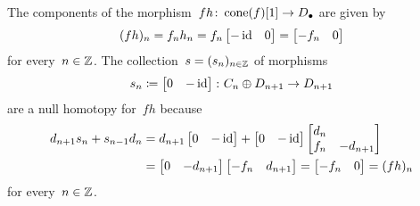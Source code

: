 \section{}





\subsection{}

The components of the morphism~$fh \colon \operatorname{cone}(f)[1] \to D_\bullet$ are given by
\[
    (fh)_n
  = f_n h_n
  = f_n
    \begin{bmatrix}
      -\operatorname{id}  & 0
    \end{bmatrix}
  = \begin{bmatrix}
      -f_n  & 0
    \end{bmatrix}
\]
for every~$n \in \mathbb{Z}$.
The collection~$s = (s_n)_{n \in \mathbb{Z}}$ of morphisms
\[
            s_n
  \coloneqq  \begin{bmatrix}
              0 & -\operatorname{id}
            \end{bmatrix}
  \colon    C_n \oplus D_{n+1}
  \to       D_{n+1}
\]
are a null homotopy for~$fh$ because
\begin{align*}
      d_{n+1} s_n + s_{n-1} d_n
  &=  d_{n+1}
      \begin{bmatrix}
        0 & -\operatorname{id}
      \end{bmatrix}
      +
      \begin{bmatrix}
        0 & -\operatorname{id}
      \end{bmatrix}
      \begin{bmatrix}
        d_n &           \\
        f_n & -d_{n+1}
      \end{bmatrix}
\\
  &=  \begin{bmatrix}
        0 & -d_{n+1}
      \end{bmatrix}
      \begin{bmatrix}
        -f_n  & d_{n+1}
      \end{bmatrix}
   =  \begin{bmatrix}
        -f_n  & 0
      \end{bmatrix}
   =  (fh)_n
\end{align*}
for every~$n \in \mathbb{Z}$.





\subsection{}

